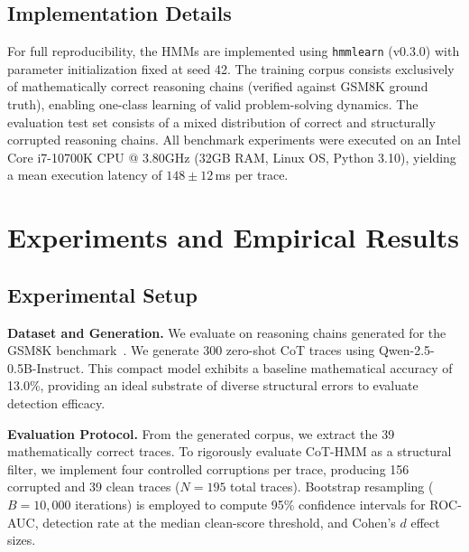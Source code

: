 \documentclass[runningheads]{llncs}
\begin{document}
\subsection{Implementation Details}

For full reproducibility, the HMMs are implemented using \texttt{hmmlearn} (v0.3.0) with parameter initialization fixed at seed 42. The training corpus consists exclusively of mathematically correct reasoning chains (verified against GSM8K ground truth), enabling one-class learning of valid problem-solving dynamics. The evaluation test set consists of a mixed distribution of correct and structurally corrupted reasoning chains. All benchmark experiments were executed on an Intel Core i7-10700K CPU @ 3.80GHz (32GB RAM, Linux OS, Python 3.10), yielding a mean execution latency of $148 \pm 12$\,ms per trace.

\section{Experiments and Empirical Results}

\subsection{Experimental Setup}

\textbf{Dataset and Generation.} We evaluate on reasoning chains generated for the GSM8K benchmark~\cite{cobbe2021training}. We generate 300 zero-shot CoT traces using Qwen-2.5-0.5B-Instruct. This compact model exhibits a baseline mathematical accuracy of 13.0\%, providing an ideal substrate of diverse structural errors to evaluate detection efficacy.

\textbf{Evaluation Protocol.} From the generated corpus, we extract the 39 mathematically correct traces. To rigorously evaluate CoT-HMM as a structural filter, we implement four controlled corruptions per trace, producing 156 corrupted and 39 clean traces ($N=195$ total traces). Bootstrap resampling ($B=10{,}000$ iterations) is employed to compute 95\% confidence intervals for ROC-AUC, detection rate at the median clean-score threshold, and Cohen's $d$ effect sizes.
\end{document}

